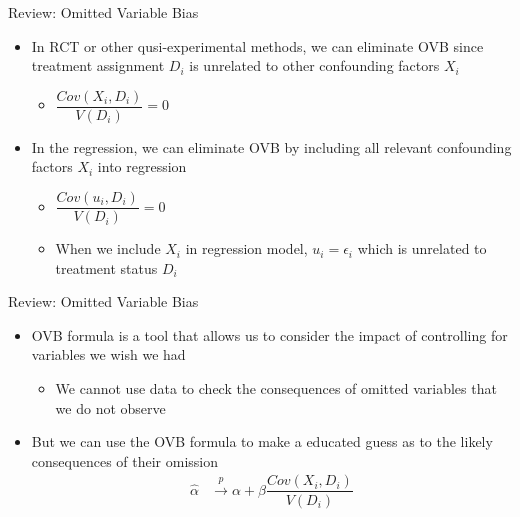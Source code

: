 \documentclass[dvipsnames,hyperref={pdfpagelabels=false}]{beamer}
\begin{document}
\begin{frame}{Review: Omitted Variable Bias}{}
	\begin{itemize}
		\item In RCT or other qusi-experimental methods, we can eliminate OVB since treatment assignment $D_{i}$ is unrelated to other confounding factors $X_{i}$ 
		\vspace{0.3cm}
			\begin{itemize}
	\item	$\dfrac{Cov(X_{i},D_{i})}{V(D_{i})}=0$
	\end{itemize}
		
		\vspace{0.3cm}
		\item In the regression, we can eliminate OVB by including all relevant confounding factors $X_{i}$ into regression
		\vspace{0.3cm}
		\begin{itemize}
			\item	$\dfrac{Cov(u_{i},D_{i})}{V(D_{i})}=0$
				\vspace{0.3cm}
			\item When we include $X_{i}$ in regression model, $u_i = \epsilon_{i}$ which is unrelated to treatment status $D_{i}$
		\end{itemize}
		
		
	\end{itemize}
\end{frame}










\begin{frame}{Review: Omitted Variable Bias}{}
\begin{itemize}
\item OVB formula is a tool that allows us to consider the impact of controlling for variables we wish we had
\vspace{0.3cm}
\begin{itemize}
\item We cannot use data to check the consequences of omitted variables that we do not observe
\vspace{0.3cm}
\end{itemize}
\item But we can use the OVB formula to make a educated guess as to the likely consequences of their omission
\begin{equation*}
	\begin{aligned}
   \hat{\alpha} &\overset{p}{\rightarrow}  \alpha + \beta \dfrac{Cov(X_{i},D_{i})}{V(D_{i})}
   	\end{aligned}	
	\end{equation*}
		
\end{itemize}
\end{frame}
\end{document}

